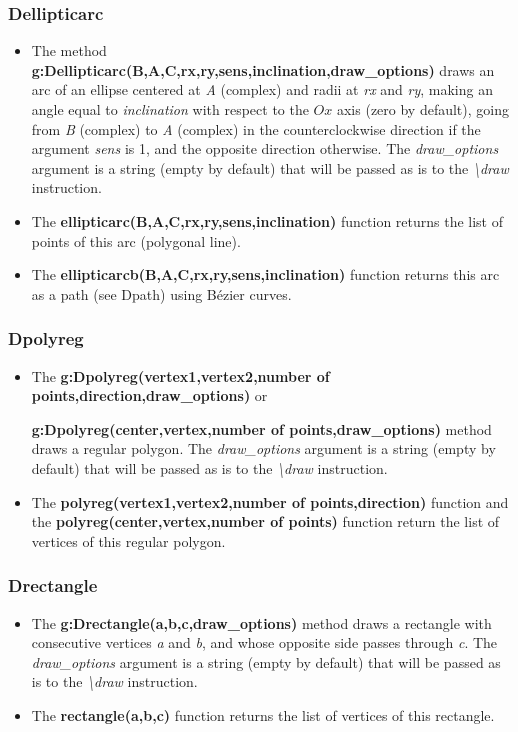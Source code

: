 \subsubsection{Dellipticarc}
\begin{itemize}
    \item The method \textbf{g:Dellipticarc(B,A,C,rx,ry,sens,inclination,draw\_options)} draws an arc of an ellipse centered at \emph{A} (complex) and radii at \emph{rx} and \emph{ry}, making an angle equal to \emph{inclination} with respect to the \(Ox\) axis (zero by default), going from \emph{B} (complex) to \emph{A} (complex) in the counterclockwise direction if the argument \emph{sens} is 1, and the opposite direction otherwise. The \emph{draw\_options} argument is a string (empty by default) that will be passed as is to the \emph{\textbackslash draw} instruction.
    \item The \textbf{ellipticarc(B,A,C,rx,ry,sens,inclination)} function returns the list of points of this arc (polygonal line).
    \item The \textbf{ellipticarcb(B,A,C,rx,ry,sens,inclination)} function returns this arc as a path (see Dpath) using Bézier curves.
\end{itemize}

\subsubsection{Dpolyreg}
\begin{itemize}
    \item The \textbf{g:Dpolyreg(vertex1,vertex2,number of points,direction,draw\_options)} or \par \textbf{g:Dpolyreg(center,vertex,number of points,draw\_options)} method draws a regular polygon. The \emph{draw\_options} argument is a string (empty by default) that will be passed as is to the \emph{\textbackslash draw} instruction.
    \item The \textbf{polyreg(vertex1,vertex2,number of points,direction)} function and the \textbf{polyreg(center,vertex,number of points)} function return the list of vertices of this regular polygon. \end{itemize}

\subsubsection{Drectangle}
\begin{itemize}
    \item The \textbf{g:Drectangle(a,b,c,draw\_options)} method draws a rectangle with consecutive vertices \emph{a} and \emph{b}, and whose opposite side passes through \emph{c}. The \emph{draw\_options} argument is a string (empty by default) that will be passed as is to the \emph{\textbackslash draw} instruction.
    \item The \textbf{rectangle(a,b,c)} function returns the list of vertices of this rectangle. \end{itemize}

